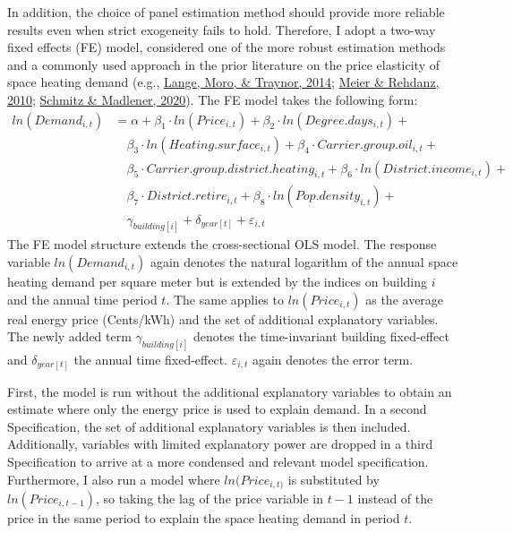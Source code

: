 \documentclass[12pt,twoside]{reedthesis}
\begin{document}
In addition, the choice of panel estimation method should provide more reliable results even when strict exogeneity fails to hold. Therefore, I adopt a two-way fixed effects (FE) model, considered one of the more robust estimation methods and a commonly used approach in the prior literature on the price elasticity of space heating demand (e.g., \protect\hyperlink{ref-lange_etal14}{Lange, Moro, \& Traynor, 2014}; \protect\hyperlink{ref-meier_rehdanz10}{Meier \& Rehdanz, 2010}; \protect\hyperlink{ref-schmitz_madlener20}{Schmitz \& Madlener, 2020}). The FE model takes the following form:
\begin{align*}
ln(Demand_{i,t}) & = \alpha + \beta_1 \cdot ln(Price_{i,t}) + \beta_2 \cdot ln(Degree.days_{i,t}) + \\
 & \quad \beta_3 \cdot ln(Heating.surface_{i,t}) + \beta_{4} \cdot Carrier.group.oil_{i,t} + \\
 & \quad \beta_{5} \cdot Carrier.group.district.heating_{i,t} + \beta_{6} \cdot ln(District.income_{i,t}) + \\
 & \quad \beta_{7} \cdot District.retire_{i,t} + \beta_{8} \cdot ln(Pop.density_{i,t}) + \\
 & \quad \gamma_{building[i]} + \delta_{year[t]} + \varepsilon_{i,t}
\end{align*}
The FE model structure extends the cross-sectional OLS model. The response variable \(ln(Demand_{i,t})\) again denotes the natural logarithm of the annual space heating demand per square meter but is extended by the indices on building \(i\) and the annual time period \(t\). The same applies to \(ln(Price_{i,t})\) as the average real energy price (Cents/kWh) and the set of additional explanatory variables. The newly added term \(\gamma_{building[i]}\) denotes the time-invariant building fixed-effect and \(\delta_{year[t]}\) the annual time fixed-effect. \(\varepsilon_{i,t}\) again denotes the error term.

First, the model is run without the additional explanatory variables to obtain an estimate where only the energy price is used to explain demand. In a second Specification, the set of additional explanatory variables is then included. Additionally, variables with limited explanatory power are dropped in a third Specification to arrive at a more condensed and relevant model specification. Furthermore, I also run a model where \(ln(Price_{i,t)}\) is substituted by \(ln(Price_{i,t-1})\), so taking the lag of the price variable in \(t-1\) instead of the price in the same period to explain the space heating demand in period \(t\).
\end{document}
